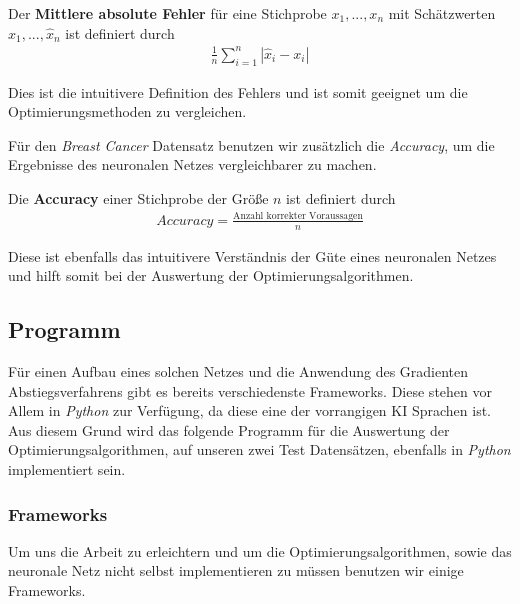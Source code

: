 \begin{definition}
    Der \textbf{Mittlere absolute Fehler} für eine Stichprobe $x_1,...,x_n$
    mit Schätzwerten $\hat{x}_1,...,\hat{x}_n$ ist definiert durch
    \begin{align}
        \frac{1}{n}\sum\limits_{i=1}^{n} | \hat{x}_i-x_i |
    \end{align}
\end{definition}

Dies ist die intuitivere Definition des Fehlers und ist somit geeignet um die
Optimierungsmethoden zu vergleichen.

Für den \textit{Breast Cancer} Datensatz benutzen wir zusätzlich die \textit{Accuracy},
um die Ergebnisse des neuronalen Netzes vergleichbarer zu machen.

\begin{definition}
    Die \textbf{Accuracy} einer Stichprobe der Größe $n$ ist definiert durch 
    \begin{align}
        Accuracy = \frac{\text{Anzahl korrekter Voraussagen}}{n}
    \end{align}
\end{definition}

Diese ist ebenfalls das intuitivere Verständnis der Güte eines neuronalen Netzes und hilft
somit bei der Auswertung der Optimierungsalgorithmen.

\subsection{Programm} \label{Programm}
 
Für einen Aufbau eines solchen Netzes und die Anwendung des Gradienten Abstiegsverfahrens
gibt es bereits verschiedenste Frameworks. Diese stehen vor Allem in \textit{Python} zur
Verfügung, da diese eine der vorrangigen KI Sprachen ist. Aus diesem Grund 
wird das folgende Programm für die Auswertung der Optimierungsalgorithmen, auf unseren
zwei Test Datensätzen, ebenfalls in \textit{Python} implementiert sein. 

\subsubsection{Frameworks}

Um uns die Arbeit zu erleichtern und um die Optimierungsalgorithmen, sowie das 
neuronale Netz nicht selbst implementieren zu müssen benutzen wir einige Frameworks.

